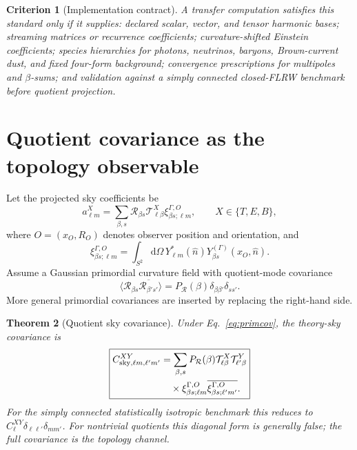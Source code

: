 \documentclass[
  aps,
  prd,
  reprint,
  superscriptaddress,
  floatfix,
  nofootinbib,
  longbibliography
]{revtex4-2}
\theoremstyle{plain}
\newtheorem{theorem}{Theorem}
\newtheorem{criterion}[theorem]{Criterion}
\theoremstyle{definition}
\theoremstyle{remark}
\newcommand{\dd}{\mathrm d}
\newcommand{\Rcl}{\mathcal R}
\newcommand{\Tcal}{\mathcal T}
\begin{document}
\begin{criterion}[Implementation contract]
A transfer computation satisfies this standard only if it supplies: declared scalar, vector, and tensor harmonic bases; streaming matrices or recurrence coefficients; curvature-shifted Einstein coefficients; species hierarchies for photons, neutrinos, baryons, Brown-current dust, and fixed four-form background; convergence prescriptions for multipoles and \(\beta\)-sums; and validation against a simply connected closed-FLRW benchmark before quotient projection.
\end{criterion}

\section{Quotient covariance as the topology observable}

Let the projected sky coefficients be
\begin{equation}
a_{\ell m}^{X}=\sum_{\beta,s}\Rcl_{\beta s}\Tcal_{\ell\beta}^{X}\xi_{\beta s;\ell m}^{\Gamma,O},
\qquad X\in\{T,E,B\},
\label{eq:alm}
\end{equation}
where \(O=(x_O,R_O)\) denotes observer position and orientation, and
\begin{equation}
\xi_{\beta s;\ell m}^{\Gamma,O}
=\int_{S^2}\dd\Omega\,Y_{\ell m}^*(\hat n)Y_{\beta s}^{(\Gamma)}(x_O,\hat n).
\end{equation}
Assume a Gaussian primordial curvature field with quotient-mode covariance
\begin{equation}
\langle\Rcl_{\beta s}\overline{\Rcl_{\beta's'}}\rangle
=P_{\mathcal R}(\beta)\delta_{\beta\beta'}\delta_{ss'}.
\label{eq:primcov}
\end{equation}
More general primordial covariances are inserted by replacing the right-hand side.

\begin{theorem}[Quotient sky covariance]
Under Eq.~\eqref{eq:primcov}, the theory-sky covariance is
\begin{equation}
\boxed{\begin{aligned}
C_{{\rm sky},\ell m,\ell' m'}^{XY}
&=\sum_{\beta,s}P_{\mathcal R}(\beta)
\Tcal_{\ell\beta}^{X}\Tcal_{\ell'\beta}^{Y}\\
&\quad\times
\xi_{\beta s;\ell m}^{\Gamma,O}
\overline{\xi_{\beta s;\ell' m'}^{\Gamma,O}}.
\end{aligned}}
\label{eq:covariance}
\end{equation}
For the simply connected statistically isotropic benchmark this reduces to \(C_\ell^{XY}\delta_{\ell\ell'}\delta_{mm'}\).  For nontrivial quotients this diagonal form is generally false; the full covariance is the topology channel.
\end{theorem}
\end{document}
